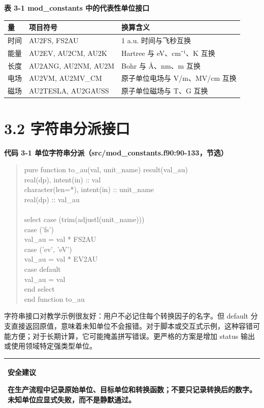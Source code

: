 \documentclass[UTF8,openany,11pt,fontset=fandol]{ctexbook}
\begin{document}
\textbf{表 3-1 mod\_constants 中的代表性单位接口}

\begin{longtable}[]{@{}lll@{}}
\toprule
\textbf{量} & \textbf{项目符号} & \textbf{换算含义}\tabularnewline
\midrule
\endhead
时间 & AU2FS, FS2AU & 1 a.u. 时间与飞秒互换\tabularnewline
能量 & AU2EV, AU2CM, AU2K & Hartree 与 eV、cm⁻¹、K 互换\tabularnewline
长度 & AU2ANG, AU2NM, AU2M & Bohr 与 Å、nm、m 互换\tabularnewline
电场 & AU2VM, AU2MV\_CM & 原子单位电场与 V/m、MV/cm 互换\tabularnewline
磁场 & AU2TESLA, AU2GAUSS & 原子单位磁场与 T、G 互换\tabularnewline
\bottomrule
\end{longtable}

\section{\texorpdfstring{\textbf{3.2
字符串分派接口}}{3.2 字符串分派接口}}\label{ux5b57ux7b26ux4e32ux5206ux6d3eux63a5ux53e3}

\textbf{代码 3-1 单位字符串分派（src/mod\_constants.f90:90-133，节选）}

\begin{quote}
pure function to\_au(val, unit\_name) result(val\_au)\\
real(dp), intent(in) :: val\\
character(len=*), intent(in) :: unit\_name\\
real(dp) :: val\_au\\
~\\
select case (trim(adjustl(unit\_name)))\\
case ('fs')\\
val\_au = val * FS2AU\\
case ('ev', 'eV')\\
val\_au = val * EV2AU\\
case default\\
val\_au = val\\
end select\\
end function to\_au
\end{quote}

字符串接口对教学示例很友好：用户不必记住每个转换因子的名字。但 default
分支直接返回原值，意味着未知单位不会报错。对于脚本或交互式示例，这种容错可能方便；对于长期计算，它可能掩盖拼写错误。更严格的方案是增加
status 输出或使用领域特定强类型单位。

\begin{longtable}[]{@{}l@{}}
\toprule
\endhead
\begin{minipage}[t]{0.97\columnwidth}\raggedright
\textbf{安全建议}

在生产流程中记录原始单位、目标单位和转换函数；不要只记录转换后的数字。未知单位应显式失败，而不是静默通过。\strut
\end{minipage}\tabularnewline
\bottomrule
\end{longtable}
\end{document}
